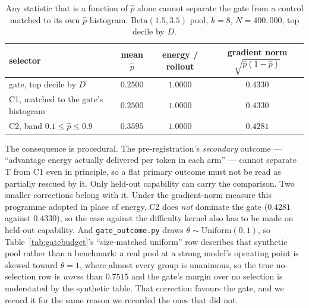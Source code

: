 \begin{table}[t]
\centering\small
\caption{Any statistic that is a function of $\hat p$ alone cannot separate the gate from a
control matched to its own $\hat p$ histogram. $\mathrm{Beta}(1.5,3.5)$ pool, $k=8$,
$N=400{,}000$, top decile by $D$.}
\label{tab:c1tie}
\begin{tabular}{lccc}
\toprule
selector & mean $\hat p$ & energy / rollout & gradient norm $\sqrt{\hat p(1-\hat p)}$ \\
\midrule
gate, top decile by $D$              & $0.2500$ & $1.0000$ & $0.4330$ \\
C1, matched to the gate's histogram  & $0.2500$ & $1.0000$ & $0.4330$ \\
C2, band $0.1\le\hat p\le0.9$        & $0.3595$ & $1.0000$ & $0.4281$ \\
\bottomrule
\end{tabular}
\end{table}

The consequence is procedural. The pre-registration's \emph{secondary} outcome --- ``advantage
energy actually delivered per token in each arm'' --- cannot separate T from C1 even in
principle, so a flat primary outcome must not be read as partially rescued by it. Only
held-out capability can carry the comparison. Two smaller corrections belong with it. Under
the gradient-norm measure this programme adopted in place of energy, C2 does \emph{not}
dominate the gate ($0.4281$ against $0.4330$), so the case against the difficulty kernel also
has to be made on held-out capability. And \texttt{gate\_outcome.py} draws
$\theta\sim\mathrm{Uniform}(0,1)$, so Table~\ref{tab:gatebudget}'s ``size-matched uniform''
row describes that synthetic pool rather than a benchmark: a real pool at a strong model's
operating point is skewed toward $\theta=1$, where almost every group is unanimous, so the
true no-selection row is \emph{worse} than $0.7515$ and the gate's margin over no selection is
understated by the synthetic table. That correction favours the gate, and we record it for the
same reason we recorded the ones that did not.

